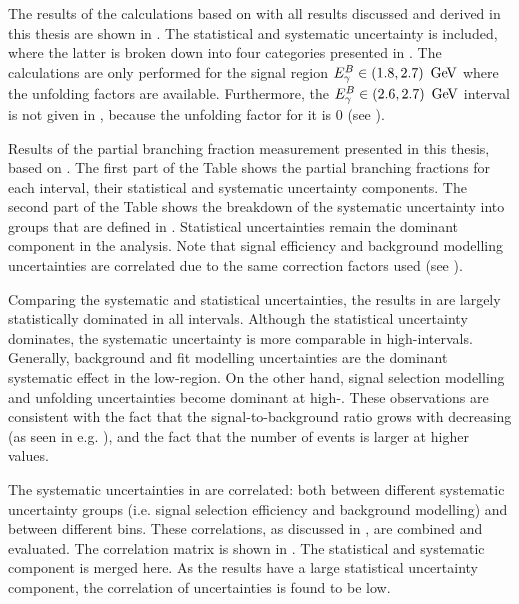 The results of the calculations based on  with all 
results discussed and derived in this thesis are shown in .
The statistical and systematic uncertainty is included, where the latter is broken down into four categories presented in .
The calculations are only performed for the signal region ${E^B_{\gamma}}\in(1.8,2.7)~\mathrm{\,Ge\kern -0.1em V}$ where the unfolding factors are available.
Furthermore, the ${E^B_{\gamma}}\in(2.6,2.7)~\mathrm{\,Ge\kern -0.1em V}$ interval is not given in , 
because the unfolding factor for it is 0 (see ).

\begin{table}[htbp!]
    \centering
    \caption{\label{tab:partial_branching_fractions}
    Results of the partial branching fraction measurement presented in this thesis, based on . 
    The first part of the Table shows the partial branching fractions for each \EB interval, their statistical and systematic uncertainty components.
    The second part of the Table shows the breakdown of the systematic uncertainty into groups that are defined in . 
    Statistical uncertainties remain the dominant component in the analysis.
    Note that signal efficiency and background modelling uncertainties are correlated due to the same correction factors used (see ).
    }
    
\end{table}

Comparing the systematic and statistical uncertainties, the results in  
are largely statistically dominated in all \EB intervals.
Although the statistical uncertainty dominates, the systematic uncertainty is more comparable in high-\EB intervals.
Generally, background and fit modelling uncertainties are the dominant systematic effect in the low-\EB region.
On the other hand, signal selection modelling and unfolding uncertainties become dominant at high-\EB.
These observations are consistent with the fact that the signal-to-background ratio grows with decreasing \EB (as seen in e.g. ),
and the fact that the number of \BtoXsgamma events is larger at higher \EB values.

The systematic uncertainties in  are correlated:
both between different systematic uncertainty groups (i.e. signal selection efficiency and background modelling)
and between different \EB bins.
These correlations, as discussed in , are combined and evaluated.
The correlation matrix is shown in .
The statistical and systematic component is merged here.
As the results have a large statistical uncertainty component, the correlation of uncertainties is found to be low.

